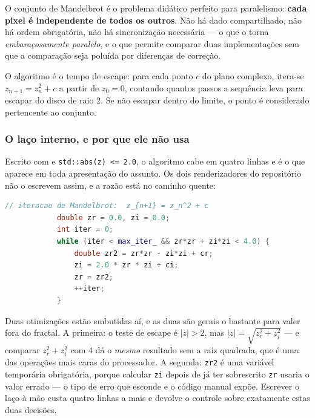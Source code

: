 O conjunto de Mandelbrot é o problema didático perfeito para paralelismo:
\textbf{cada pixel é independente de todos os outros}. Não há dado
compartilhado, não há ordem obrigatória, não há sincronização necessária --- o
que o torna \emph{embaraçosamente paralelo}, e o que permite comparar duas
implementações sem que a comparação seja poluída por diferenças de correção.

O algoritmo é o tempo de escape: para cada ponto $c$ do plano complexo, itera-se
$z_{n+1} = z_n^2 + c$ a partir de $z_0 = 0$, contando quantos passos a sequência
leva para escapar do disco de raio 2. Se não escapar dentro do limite, o ponto é
considerado pertencente ao conjunto.

\subsubsection{O laço interno, e por que ele não usa }

Escrito com  e \texttt{std::abs(z) <= 2.0}, o
algoritmo cabe em quatro linhas e é o que aparece em toda apresentação do
assunto. Os dois renderizadores do repositório não o escrevem assim, e a razão
está no caminho quente:

\begin{lstlisting}[style=bt, language=C++,
    caption={O laço de escape, em
             \texttt{src/mandelbrot/mandelbrot\_renderer.cpp}.}]
            // iteracao de Mandelbrot:  z_{n+1} = z_n^2 + c
            double zr = 0.0, zi = 0.0;
            int iter = 0;
            while (iter < max_iter_ && zr*zr + zi*zi < 4.0) {
                double zr2 = zr*zr - zi*zi + cr;
                zi = 2.0 * zr * zi + ci;
                zr = zr2;
                ++iter;
            }
\end{lstlisting}

Duas otimizações estão embutidas aí, e as duas são gerais o bastante para valer
fora do fractal. A primeira: o teste de escape é $|z| > 2$, mas
$|z| = \sqrt{z_r^2 + z_i^2}$ --- e comparar $z_r^2 + z_i^2$ com $4$ dá o
\emph{mesmo} resultado sem a raiz quadrada, que é uma das operações mais caras
do processador. A segunda: \texttt{zr2} é uma variável temporária obrigatória,
porque calcular \texttt{zi} depois de já ter sobrescrito \texttt{zr} usaria o
valor errado --- o tipo de erro que  esconde e o código
manual expõe. Escrever o laço à mão custa quatro linhas a mais e devolve o
controle sobre exatamente estas duas decisões.

